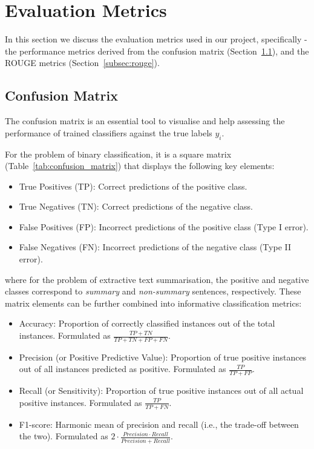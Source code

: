 \section{Evaluation Metrics}\label{sec:evaluation-metrics}
In this section we discuss the evaluation metrics used in our project, specifically -
the performance metrics derived from the confusion matrix (Section~\ref{subsec:confusion-matrix}),
and the ROUGE metrics (Section~\ref{subsec:rouge}).
\subsection{Confusion Matrix}\label{subsec:confusion-matrix}
The confusion matrix is an essential tool to visualise and help assessing the performance of trained classifiers against
the true labels $y_{i}$.

For the problem of binary classification, it is a square matrix (Table~\ref{tab:confusion_matrix}) that displays the
following key elements:

\begin{itemize}
    \item True Positives (TP): Correct predictions of the positive class.
    \item True Negatives (TN): Correct predictions of the negative class.
    \item False Positives (FP): Incorrect predictions of the positive class (Type I error).
    \item False Negatives (FN): Incorrect predictions of the negative class (Type II error).
\end{itemize}

where for the problem of extractive text summarisation, the positive and negative classes correspond to \emph{summary}
and \emph{non-summary} sentences, respectively.
These matrix elements can be further combined into informative classification metrics:

\begin{itemize}
    \item Accuracy: Proportion of correctly classified instances out of the total instances.
    Formulated as $\frac{TP + TN}{TP + TN + FP + FN}$.
    \item Precision (or Positive Predictive Value): Proportion of true positive instances out of all instances predicted as positive.
    Formulated as $\frac{TP}{TP + FP}$.
    \item Recall (or Sensitivity): Proportion of true positive instances out of all actual positive instances.
    Formulated as $\frac{TP}{TP + FN}$.
    \item F1-score: Harmonic mean of precision and recall (i.e., the trade-off between the two).
    Formulated as $2 \cdot \frac{Precision \cdot Recall}{Precision + Recall}$.
\end{itemize}




